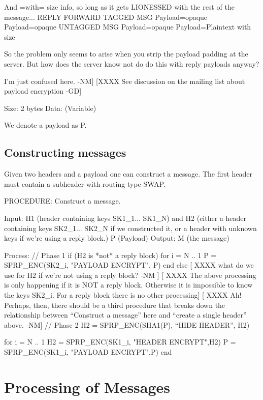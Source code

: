      And =with= size info, so long as it gets LIONESSED with the
     rest of the message...
                            REPLY          FORWARD 
          TAGGED MSG     Payload=opaque  Payload=opaque 
          UNTAGGED MSG   Payload=opaque  Payload=Plaintext with size

     So the problem only seems to arise when you strip the payload
     padding at the server.  But how does the server know not do
     do this with reply payloads anyway?

     I'm just confused here. -NM]
[XXXX See discussion on the mailing list about payload encryption -GD]

Size:   2 bytes
Data:   (Variable)

We denote a payload as P.

\subsection{Constructing messages}

Given two headers and a payload one can construct a
message. The first header must contain a subheader
with routing type SWAP.  

PROCEDURE: Construct a message.

Input: H1 (header containing keys SK1_1... SK1_N)
       and H2 (either a header containing keys SK2_1... SK2_N if
         we constructed it, or a header with unknown keys if we're
         using a reply block.)
       P (Payload)
Output: M (the message)

Process:
	// Phase 1
	if (H2 is *not* a reply block)
		for i = N .. 1
	            P = SPRP_ENC(SK2_i, "PAYLOAD ENCRYPT", P)
		end
        else
           [ XXXX what do we use for H2 if we're not using a reply
	           block? -NM ]
	   [ XXXX The above processing is only happening if it is NOT
	a reply block. Otherwise it is impossible to know the keys
	SK2_i. For a reply block there is no other processing]
           [ XXXX Ah!  Perhaps, then, there should be a third
	          procedure that breaks down the relationship between
                  ``Construct a message'' here and ``create a single header''
                  above. -NM]
	// Phase 2
	H2 = SPRP_ENC(SHA1(P), ``HIDE HEADER'', H2)

	for i = N .. 1
		H2 = SPRP_ENC(SK1_i, "HEADER ENCRYPT",H2)
		P = SPRP_ENC(SK1_i, "PAYLOAD ENCRYPT",P)
	end

\section{Processing of Messages}

